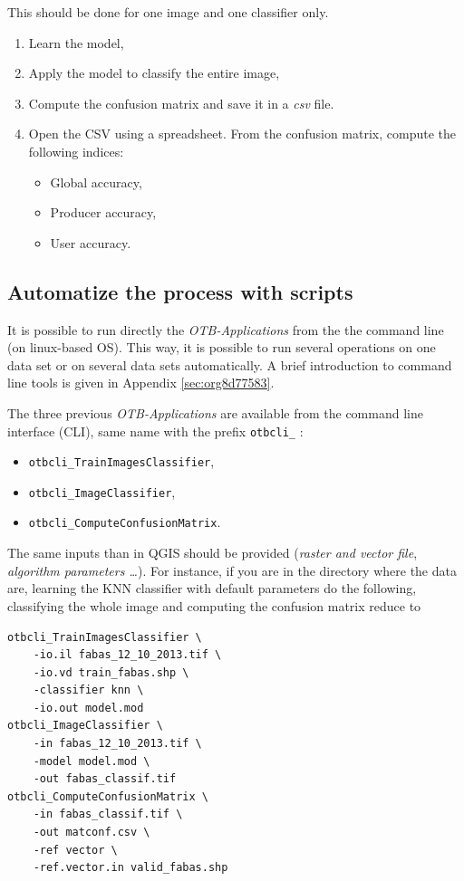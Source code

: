 \documentclass[a4paper,11pt,DIV=18]{scrartcl}
\begin{document}
\begin{work}
This should be done for one image and one classifier only.
\begin{enumerate}
\item Learn the model,
\item Apply the model to classify the entire image,
\item Compute the confusion matrix and save it in a \emph{csv} file.
\item Open  the CSV  using a spreadsheet.   From the  confusion matrix,
compute the following indices:
\begin{itemize}
\item Global accuracy,
\item Producer accuracy,
\item User accuracy.
\end{itemize}
\end{enumerate}
\end{work}

\subsection{Automatize the process with scripts}
\label{sec:org4d89326}
It  is possible  to run  directly  the \emph{OTB-Applications}  from the  the
command line  (on linux-based  OS). This  way, it  is possible  to run
several  operations  on   one  data  set  or  on   several  data  sets
automatically.  A brief introduction to command line tools is given in
Appendix \ref{sec:org8d77583}.

The  three previous  \emph{OTB-Applications} are  available from  the command
line interface (CLI), same name with the prefix \texttt{otbcli\_} :

\begin{itemize}
\item \texttt{otbcli\_TrainImagesClassifier},
\item \texttt{otbcli\_ImageClassifier},
\item \texttt{otbcli\_ComputeConfusionMatrix}.
\end{itemize}

The same  inputs than in  QGIS should  be provided (\emph{raster  and vector
file},  \emph{algorithm parameters  \ldots{}}). For  instance,  if you  are in  the
directory where the data are, learning the KNN classifier with default
parameters do the following, classifying the whole image and computing
the confusion matrix reduce to

\begin{verbatim}
otbcli_TrainImagesClassifier \
    -io.il fabas_12_10_2013.tif \
    -io.vd train_fabas.shp \
    -classifier knn \
    -io.out model.mod
otbcli_ImageClassifier \
    -in fabas_12_10_2013.tif \
    -model model.mod \
    -out fabas_classif.tif
otbcli_ComputeConfusionMatrix \
    -in fabas_classif.tif \
    -out matconf.csv \
    -ref vector \
    -ref.vector.in valid_fabas.shp
\end{verbatim}
\end{document}

